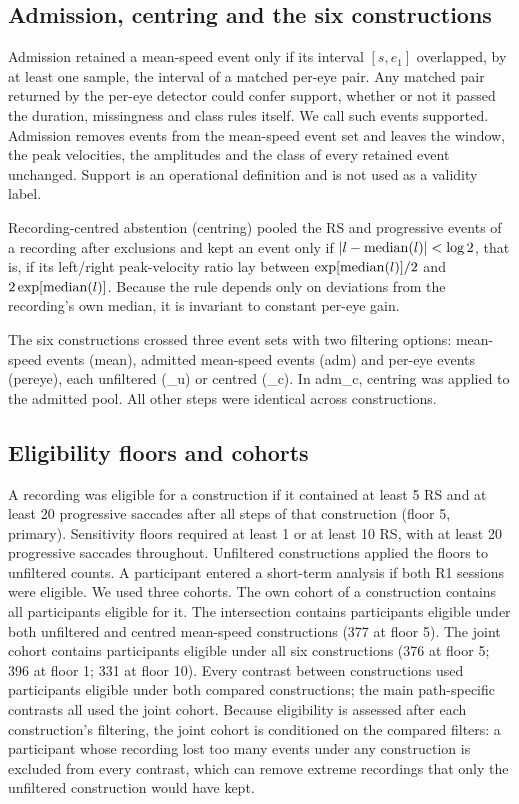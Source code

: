 \subsection{Admission, centring and the six constructions}

Admission retained a mean-speed event only if its interval $[s, e_1]$ overlapped, by at least one sample, the interval of a matched per-eye pair. Any matched pair returned by the per-eye detector could confer support, whether or not it passed the duration, missingness and class rules itself. We call such events supported. Admission removes events from the mean-speed event set and leaves the window, the peak velocities, the amplitudes and the class of every retained event unchanged. Support is an operational definition and is not used as a validity label.

Recording-centred abstention (centring) pooled the RS and progressive events of a recording after exclusions and kept an event only if $|l - \operatorname{median}(l)| < \log 2$, that is, if its left/right peak-velocity ratio lay between $\exp[\operatorname{median}(l)]/2$ and $2\exp[\operatorname{median}(l)]$. Because the rule depends only on deviations from the recording's own median, it is invariant to constant per-eye gain.

The six constructions crossed three event sets with two filtering options: mean-speed events (mean), admitted mean-speed events (adm) and per-eye events (pereye), each unfiltered (\_u) or centred (\_c). In adm\_c, centring was applied to the admitted pool. All other steps were identical across constructions.

\subsection{Eligibility floors and cohorts}

A recording was eligible for a construction if it contained at least 5 RS and at least 20 progressive saccades after all steps of that construction (floor 5, primary). Sensitivity floors required at least 1 or at least 10 RS, with at least 20 progressive saccades throughout. Unfiltered constructions applied the floors to unfiltered counts. A participant entered a short-term analysis if both R1 sessions were eligible. We used three cohorts. The own cohort of a construction contains all participants eligible for it. The intersection contains participants eligible under both unfiltered and centred mean-speed constructions (377 at floor 5). The joint cohort contains participants eligible under all six constructions (376 at floor 5; 396 at floor 1; 331 at floor 10). Every contrast between constructions used participants eligible under both compared constructions; the main path-specific contrasts all used the joint cohort. Because eligibility is assessed after each construction's filtering, the joint cohort is conditioned on the compared filters: a participant whose recording lost too many events under any construction is excluded from every contrast, which can remove extreme recordings that only the unfiltered construction would have kept.

